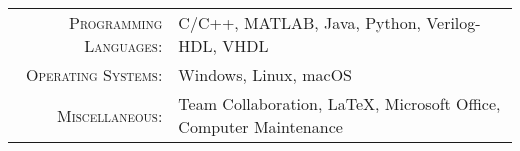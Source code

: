 \documentclass[localFont, alternative]{awesome-source-cv}
\begin{document}
% 
% 
% 
%
%
\renewcommand{\arraystretch}{1.1}

	\begin{tabular}{>{}r>{}p{13cm}}
		\textsc{Programming Languages:}  		&   C/C++, MATLAB, Java, Python, Verilog-HDL, VHDL\\
		\textsc{Operating Systems:}	        &   Windows, Linux, macOS\\
    \textsc{Miscellaneous:}							&   Team Collaboration, \LaTeX, Microsoft Office, Computer Maintenance\\
	\end{tabular}

%

\end{document}
